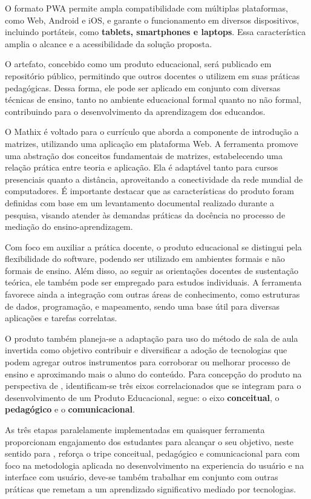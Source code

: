 O formato PWA permite ampla compatibilidade com múltiplas plataformas, como Web, Android e iOS, e garante o funcionamento em diversos dispositivos, incluindo portáteis, como \textbf{tablets, smartphones e laptops}. Essa característica amplia o alcance e a acessibilidade da solução proposta.

O artefato, concebido como um produto educacional, será publicado em repositório público, permitindo que outros docentes o utilizem em suas práticas pedagógicas. Dessa forma, ele pode ser aplicado em conjunto com diversas técnicas de ensino, tanto no ambiente educacional formal quanto no não formal, contribuindo para o desenvolvimento da aprendizagem dos educandos.

O Mathix é voltado para o currículo que aborda a componente de introdução a matrizes, utilizando uma aplicação em plataforma Web. A ferramenta promove uma abstração dos conceitos fundamentais de matrizes, estabelecendo uma relação prática entre teoria e aplicação. Ela é adaptável tanto para cursos presenciais quanto a distância, aproveitando a conectividade da rede mundial de computadores. É importante destacar que as características do produto foram definidas com base em um levantamento documental realizado durante a pesquisa, visando atender às demandas práticas da docência no processo de mediação do ensino-aprendizagem.

Com foco em auxiliar a prática docente, o produto educacional se distingui pela flexibilidade do software, podendo ser utilizado em ambientes formais e não formais de ensino. Além disso, ao seguir as orientações docentes de sustentação teórica, ele também pode ser empregado para estudos individuais. A ferramenta favorece ainda a integração com outras áreas de conhecimento, como estruturas de dados, programação, e mapeamento, sendo uma base útil para diversas aplicações e tarefas correlatas.


O produto também planeja-se a adaptação para uso do método de sala de aula invertida como objetivo contribuir e diversificar a adoção de tecnologias que podem agregar outros instrumentos para corroborar ou melhorar processo de ensino e aproximando mais o aluno do conteúdo. Para concepção do produto na perspectiva de , identificam-se três eixos correlacionados que se integram para o desenvolvimento de um Produto Educacional, segue: o eixo \textbf{conceitual}, o \textbf{pedagógico} e o \textbf{comunicacional}.


As três etapas paralelamente implementadas em quaisquer ferramenta proporcionam engajamento dos estudantes para alcançar o seu objetivo, neste sentido para , reforça o tripe conceitual, pedagógico e comunicacional para com  foco na metodologia aplicada no desenvolvimento na experiencia do usuário e na interface com usuário, deve-se também trabalhar em conjunto com outras práticas que remetam a um aprendizado significativo mediado por tecnologias.



